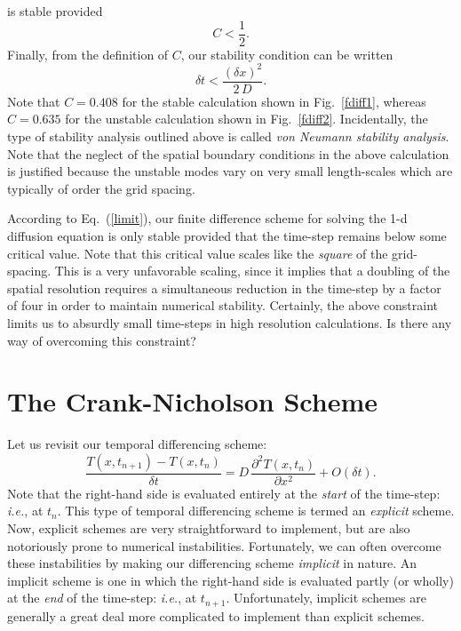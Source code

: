is stable provided 
\begin{equation}
C < \frac{1}{2}.
\end{equation}
Finally, from the definition of $C$, our stability condition can be written
\begin{equation}\label{limit}
\delta t < \frac{(\delta x)^2}{2\,D}.
\end{equation}
Note that $C=0.408$ for the stable calculation shown in Fig.~\ref{fdiff1}, whereas $C=0.635$
for the unstable calculation shown in Fig.~\ref{fdiff2}.
Incidentally, the type of stability analysis outlined above is called {\em von Neumann stability analysis}.
Note that the neglect of the spatial boundary conditions in the above calculation is justified
because the unstable modes vary on very small length-scales which are typically of order the grid spacing.

According to Eq.~(\ref{limit}), our finite difference scheme for solving the 1-d diffusion
equation is only stable provided that the time-step remains below some critical value.
Note that this critical value scales like the {\em square} of the grid-spacing. This is
a very unfavorable scaling, since it implies that a doubling of the spatial resolution
requires a simultaneous reduction
in the time-step  by a factor of four in order to maintain numerical stability. 
Certainly, the above constraint limits us to absurdly small time-steps in high resolution
calculations.
Is there any way of overcoming this constraint?

\section{The Crank-Nicholson Scheme}\label{cn}
Let us revisit our temporal differencing scheme:
\begin{equation}
\frac{T(x,t_{n+1}) - T(x,t_n)}{\delta t} 
= D \,\frac{\partial^2 T(x,t_n)}{\partial x^2}+ O(\delta t).
\end{equation}
Note that the right-hand side is evaluated entirely at the {\em start}
of the time-step: {\em i.e.}, at $t_n$. This type of
temporal differencing scheme is termed an {\em explicit} scheme. Now, explicit schemes are
very straightforward to implement, but are also notoriously prone to numerical instabilities.
Fortunately, we can often overcome these  instabilities by making our differencing
scheme {\em implicit} in nature. An implicit scheme is one in which the right-hand
side is evaluated partly (or wholly) at the {\em end} of the time-step: {\em i.e.}, at $t_{n+1}$.
Unfortunately, implicit schemes are generally a great deal more complicated to implement
than explicit schemes.

